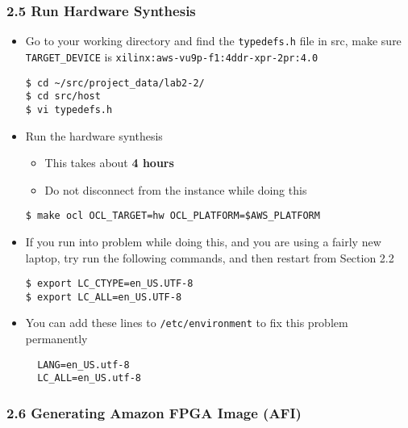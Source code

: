 \documentclass[]{article}
\begin{document}
\hypertarget{header-n299}{%
\subsubsection{2.5 Run Hardware Synthesis}\label{header-n299}}

\begin{itemize}
\item
  Go to your working directory and find the \texttt{typedefs.h} file in
  src, make sure \texttt{TARGET\_DEVICE} is
  \texttt{xilinx:aws-vu9p-f1:4ddr-xpr-2pr:4.0}

\begin{verbatim}
$ cd ~/src/project_data/lab2-2/
$ cd src/host
$ vi typedefs.h
\end{verbatim}
\end{itemize}

\begin{itemize}
\item
  Run the hardware synthesis

  \begin{itemize}
  \item
    This takes about \textbf{4 hours}
  \item
    Do not disconnect from the instance while doing this
  \end{itemize}

\begin{verbatim}
$ make ocl OCL_TARGET=hw OCL_PLATFORM=$AWS_PLATFORM
\end{verbatim}
\end{itemize}

\begin{itemize}
\item
  If you run into problem while doing this, and you are using a fairly
  new laptop, try run the following commands, and then restart from
  Section 2.2

\begin{verbatim}
$ export LC_CTYPE=en_US.UTF-8
$ export LC_ALL=en_US.UTF-8
\end{verbatim}
\item
  You can add these lines to \texttt{/etc/environment} to fix this
  problem permanently

\begin{verbatim}
  LANG=en_US.utf-8
  LC_ALL=en_US.utf-8
\end{verbatim}
\end{itemize}

\hypertarget{header-n338}{%
\subsubsection{2.6 Generating Amazon FPGA Image
(AFI)}\label{header-n338}}
\end{document}
